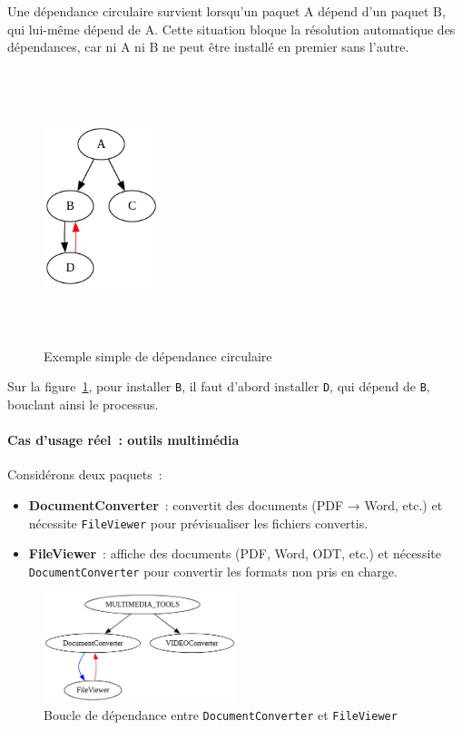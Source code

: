 Une dépendance circulaire survient lorsqu’un paquet A dépend d’un paquet B, qui lui-même dépend de A. Cette situation bloque la résolution automatique des dépendances, car ni A ni B ne peut être installé en premier sans l’autre.

\begin{figure}[H]
  \centering
  \includegraphics[width=0.3\textwidth, height=8cm]{images_pfe/CERCULARDEP.png}
  \caption{Exemple simple de dépendance circulaire}
  \label{fig:circular-dep}
\end{figure}



Sur la figure~\ref{fig:circular-dep}, pour installer \texttt{B}, il faut d’abord installer \texttt{D}, qui dépend de \texttt{B}, bouclant ainsi le processus.

\paragraph{Cas d’usage réel : outils multimédia}
Considérons deux paquets :
\begin{itemize}
  \item \textbf{DocumentConverter} : convertit des documents (PDF → Word, etc.) et nécessite \texttt{FileViewer} pour prévisualiser les fichiers convertis.
  \item \textbf{FileViewer} : affiche des documents (PDF, Word, ODT, etc.) et nécessite \texttt{DocumentConverter} pour convertir les formats non pris en charge.
\end{itemize}

\begin{figure}[H]
  \centering
  \includegraphics[width=0.5\textwidth]{images_pfe/depcycleexemple.png}
  \caption{Boucle de dépendance entre \texttt{DocumentConverter} et \texttt{FileViewer}}
  \label{fig:depcycle-multimedia}
\end{figure}



